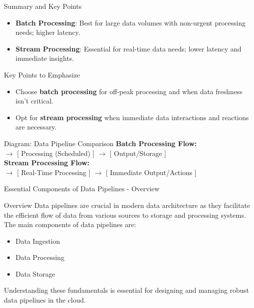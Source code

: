 \documentclass[aspectratio=169]{beamer}
\begin{document}
\begin{frame}[fragile]{Summary and Key Points}
    \begin{itemize}
        \item \textbf{Batch Processing}: Best for large data volumes with non-urgent processing needs; higher latency.
        \item \textbf{Stream Processing}: Essential for real-time data needs; lower latency and immediate insights.
    \end{itemize}

    \begin{block}{Key Points to Emphasize}
        \begin{itemize}
            \item Choose \textbf{batch processing} for off-peak processing and when data freshness isn't critical.
            \item Opt for \textbf{stream processing} when immediate data interactions and reactions are necessary.
        \end{itemize}
    \end{block}
    
    \begin{block}{Diagram: Data Pipeline Comparison}
        \textbf{Batch Processing Flow:} \\
        [ Data Collection ] $\rightarrow$ [ Processing (Scheduled) ] $\rightarrow$ [ Output/Storage ] \\

        \textbf{Stream Processing Flow:} \\
        [ Data Inflow ] $\rightarrow$ [ Real-Time Processing ] $\rightarrow$ [ Immediate Output/Actions ]
    \end{block}
\end{frame}

\begin{frame}[fragile]{Essential Components of Data Pipelines - Overview}
  \begin{block}{Overview}
    Data pipelines are crucial in modern data architecture as they facilitate the efficient flow of data from various sources to storage and processing systems. The main components of data pipelines are:
    \begin{itemize}
      \item Data Ingestion
      \item Data Processing
      \item Data Storage
    \end{itemize}
    Understanding these fundamentals is essential for designing and managing robust data pipelines in the cloud.
  \end{block}
\end{frame}
\end{document}
